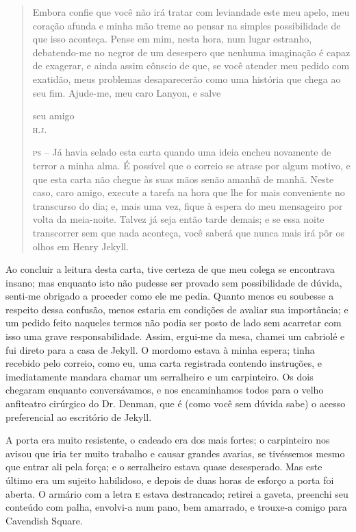 \begin{quote}
Embora confie que você não irá tratar com leviandade este meu apelo, meu
coração afunda e minha mão treme ao pensar na simples possibilidade de
que isso aconteça.  Pense em mim, nesta hora, num lugar estranho,
debatendo-me no negror de um desespero que nenhuma imaginação é capaz
de exagerar, e ainda assim cônscio de que, se você atender meu pedido
com exatidão, meus problemas desaparecerão como uma história que chega
ao seu fim.  Ajude-me, meu caro Lanyon, e salve

{\raggedleft seu amigo\\
\textsc{h.j.} \par}

\textsc{ps} -- Já havia selado esta carta quando uma ideia encheu novamente de
terror a minha alma.  É possível que o correio se atrase por algum
motivo, e que esta carta não chegue às suas mãos senão amanhã de manhã.
 Neste caso, caro amigo, execute a tarefa na hora que lhe for mais
conveniente no transcurso do dia; e, mais uma vez, fique à espera do
meu mensageiro por volta da meia-noite.  Talvez já seja então tarde
demais; e se essa noite transcorrer sem que nada aconteça, você saberá
que nunca mais irá pôr os olhos em Henry Jekyll.
\end{quote}

Ao concluir a leitura desta carta, tive certeza de que meu colega se
encontrava insano; mas enquanto isto não pudesse ser provado sem
possibilidade de dúvida, senti-me obrigado a proceder como ele me
pedia.  Quanto menos eu soubesse a respeito dessa confusão, menos
estaria em condições de avaliar sua importância; e um pedido feito
naqueles termos não podia ser posto de lado sem acarretar com isso uma
grave responsabilidade.  Assim, ergui-me da mesa, chamei um cabriolé e
fui direto para a casa de Jekyll.  O mordomo estava à minha espera;
tinha recebido pelo correio, como eu, uma carta registrada contendo
instruções, e imediatamente mandara chamar um serralheiro e um
carpinteiro.  Os dois chegaram enquanto conversávamos, e nos
encaminhamos todos para o velho anfiteatro cirúrgico do Dr. Denman, que
é (como você sem dúvida sabe) o acesso preferencial ao escritório de
Jekyll. 

A porta era muito resistente, o cadeado era dos mais fortes; o
carpinteiro nos avisou que iria ter muito trabalho e causar grandes
avarias, se tivéssemos mesmo que entrar ali pela força; e o serralheiro
estava quase desesperado.  Mas este último era um sujeito habilidoso, e
depois de duas horas de esforço a porta foi aberta.  O armário com a
letra \textsc{e} estava destrancado; retirei a gaveta, preenchi seu conteúdo com
palha, envolvi-a num pano, bem amarrado, e trouxe-a comigo para
Cavendish Square.

